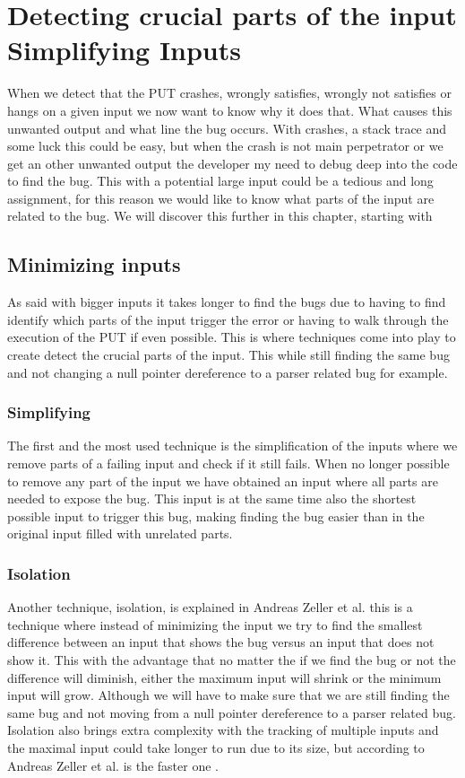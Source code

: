 \chapter{Detecting crucial parts of the input Simplifying Inputs} 
\label{cha:3}
When we detect that the PUT crashes, wrongly satisfies, wrongly not satisfies or hangs on a given input we now want to know why it does that. What causes this unwanted output and what line the bug occurs. With crashes, a stack trace and some luck this could be easy, but when the crash is not main perpetrator or we get an other unwanted output the developer my need to debug deep into the code to find the bug. This with a potential large input could be a tedious and long assignment, for this reason we would like to know what parts of the input are related to the bug. We will discover this further in this chapter, starting with 

\section{Minimizing inputs}
As said with bigger inputs it takes longer to find the bugs due to having to find identify which parts of the input trigger the error or having to walk through the execution of the PUT if even possible. This is where techniques come into play to create detect the crucial parts of the input. This while still finding the same bug and not changing a null pointer dereference to a parser related bug for example.\cite{bookZellerwhyProgramsFail}

\subsection{Simplifying}
The first and the most used technique is the simplification of the inputs where we remove parts of a failing input and check if it still fails. When no longer possible to remove any part of the input we have obtained an input where all parts are needed to expose the bug. This input is at the same time also the shortest possible input to trigger this bug, making finding the bug easier than in the original input filled with unrelated parts. 
\subsection{Isolation}
Another technique, isolation, is explained in Andreas Zeller et al. 
\cite{5zeller2002simplifyingIsolatingFailure-inducing} this is a technique where instead of minimizing the input we try to find the smallest difference between an input that shows the bug versus an input that does not show it. This with the advantage that no matter the if we find the bug or not the difference will diminish, either the maximum input will shrink or the minimum input will grow. Although we will have to make sure that we are still finding the same bug and not moving from a null pointer dereference to a parser related bug. Isolation also brings extra complexity with the tracking of multiple inputs and the maximal input could take longer to run due to its size, but according to Andreas Zeller et al. is the faster one .

